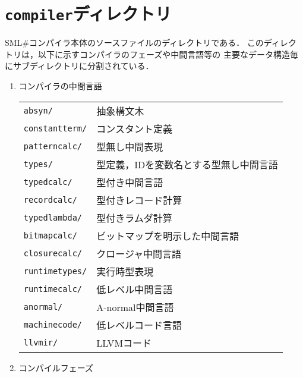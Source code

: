 \documentclass{jbook}
\newif\ifjp
\newcommand{\txt}[2]{#1}
\newcommand{\smlsharp}{SML\#}
\newcommand{\code}[1]{\mbox{\large\tt #1}}
\begin{document}
\section{\txt{\code{compiler}ディレクトリ}{The \code{compiler} Directory}}
\ifjp%
	\smlsharp{}コンパイラ本体のソースファイルのディレクトリである．
	このディレクトリは，以下に示すコンパイラのフェーズや中間言語等の
主要なデータ構造毎にサブディレクトリに分割されている．
\begin{enumerate}
\item 
	コンパイラの中間言語

\begin{tabular}{ll}
\code{absyn/}& 抽象構文木
\\
\code{constantterm/}& コンスタント定義
\\
\code{patterncalc/}& 型無し中間表現
\\
\code{types/}& 型定義，IDを変数名とする型無し中間言語
\\
\code{typedcalc/}& 型付き中間言語
\\
\code{recordcalc/}& 型付きレコード計算
\\
\code{typedlambda/}& 型付きラムダ計算
\\
\code{bitmapcalc/}& ビットマップを明示した中間言語
\\
\code{closurecalc/}& クロージャ中間言語
\\
\code{runtimetypes/}& 実行時型表現
\\
\code{runtimecalc/}& 低レベル中間言語
\\
\code{anormal/}& A-normal中間言語
\\
\code{machinecode/}& 低レベルコード言語
\\
\code{llvmir/}& LLVMコード
\end{tabular}

\item コンパイルフェーズ 


\end{enumerate}
\end{document}
